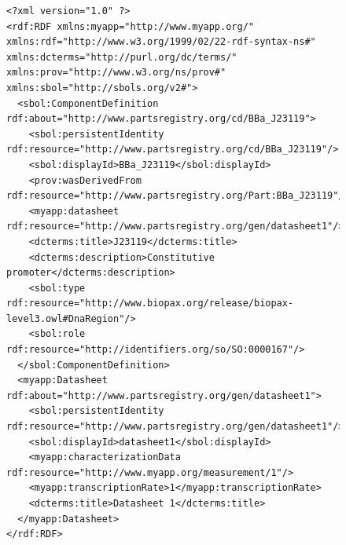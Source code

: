 \begin{figure}[ht]
\begin{lstlisting}
<?xml version="1.0" ?>
<rdf:RDF xmlns:myapp="http://www.myapp.org/" xmlns:rdf="http://www.w3.org/1999/02/22-rdf-syntax-ns#" xmlns:dcterms="http://purl.org/dc/terms/" xmlns:prov="http://www.w3.org/ns/prov#" xmlns:sbol="http://sbols.org/v2#">
  <sbol:ComponentDefinition rdf:about="http://www.partsregistry.org/cd/BBa_J23119">
    <sbol:persistentIdentity rdf:resource="http://www.partsregistry.org/cd/BBa_J23119"/>
    <sbol:displayId>BBa_J23119</sbol:displayId>
    <prov:wasDerivedFrom rdf:resource="http://www.partsregistry.org/Part:BBa_J23119"/>
    <myapp:datasheet rdf:resource="http://www.partsregistry.org/gen/datasheet1"/>
    <dcterms:title>J23119</dcterms:title>
    <dcterms:description>Constitutive promoter</dcterms:description>
    <sbol:type rdf:resource="http://www.biopax.org/release/biopax-level3.owl#DnaRegion"/>
    <sbol:role rdf:resource="http://identifiers.org/so/SO:0000167"/>
  </sbol:ComponentDefinition>
  <myapp:Datasheet rdf:about="http://www.partsregistry.org/gen/datasheet1">
    <sbol:persistentIdentity rdf:resource="http://www.partsregistry.org/gen/datasheet1"/>
    <sbol:displayId>datasheet1</sbol:displayId>
    <myapp:characterizationData rdf:resource="http://www.myapp.org/measurement/1"/>
    <myapp:transcriptionRate>1</myapp:transcriptionRate>
    <dcterms:title>Datasheet 1</dcterms:title>
  </myapp:Datasheet>
</rdf:RDF>
\end{lstlisting}
\label{ser:GenericTopLevel}
\end{figure}